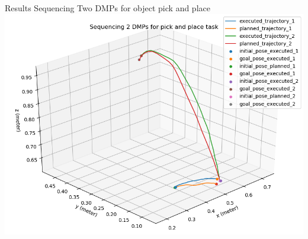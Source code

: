 \documentclass{beamer}
\begin{document}
	
	\begin{frame}{Results}
		\centering
		Sequencing Two DMPs for object pick and place
		\includegraphics[scale=0.4]{images/HSR_3/sequence.png}
	\end{frame}
\end{document}
